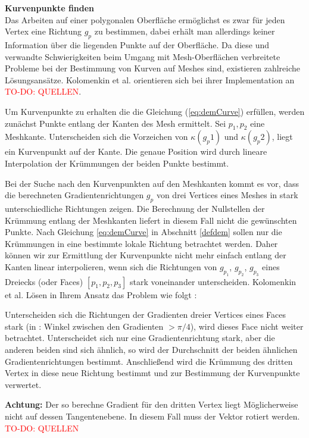 \documentclass{paperStyle}
\newcommand\todo[1]{\textcolor{red}{#1}}
\begin{document}
 \textbf{Kurvenpunkte finden}\\
 Das Arbeiten auf einer polygonalen Oberfläche ermöglichst es zwar für jeden Vertex eine Richtung $g_p$ zu bestimmen, dabei erhält man allerdings keiner Information über die liegenden Punkte auf der Oberfläche. Da diese und verwandte Schwierigkeiten beim Umgang mit Mesh-Oberflächen verbreitete Probleme bei der Bestimmung von Kurven auf Meshes sind, existieren zahlreiche Lösungsansätze. Kolomenkin et al. orientieren sich bei ihrer Implementation an \todo{TO-DO: QUELLEN}.
 
  Um Kurvenpunkte zu erhalten die die Gleichung (\ref{eq:demCurve}) erfüllen, werden zunächst Punkte entlang der Kanten des Mesh ermittelt. Sei $p_1,p_2$ eine Meshkante. Unterscheiden sich die Vorzeichen von $\kappa(g_p1)$ und $\kappa(g_p2)$, liegt ein Kurvenpunkt auf der Kante. Die genaue Position wird durch lineare Interpolation der Krümmungen der beiden Punkte bestimmt.
 
 Bei der Suche nach den Kurvenpunkten auf den Meshkanten kommt es vor, dass die berechneten Gradientenrichtungen $g_p$ von drei Vertices eines Meshes in stark unterschiedliche Richtungen zeigen. Die Berechnung der Nullstellen der Krümmung entlang der Meshkanten liefert in diesem Fall nicht die gewünschten Punkte. Nach Gleichung \ref{eq:demCurve} in Abschnitt \ref{defdem} sollen nur die Krümmungen in eine bestimmte lokale Richtung betrachtet werden. Daher können wir zur Ermittlung der Kurvenpunkte nicht mehr einfach entlang der Kanten linear interpolieren, wenn sich die Richtungen von $g_{p_1}$, $g_{p_2}$, $g_{p_3}$ eines Dreiecks (oder Faces) $[p_1, p_2, p_3]$ stark voneinander unterscheiden. Kolomenkin et al. Lösen in Ihrem Ansatz das Problem wie folgt \cite{Demarcating}: 
 
 Unterscheiden sich die Richtungen der Gradienten dreier Vertices eines Faces stark (in \cite{Demarcating}: Winkel zwischen den Gradienten $> \pi/4$), wird dieses Face nicht weiter betrachtet. Unterscheidet sich nur eine Gradientenrichtung stark, aber die anderen beiden sind sich ähnlich, so wird der Durchschnitt der beiden ähnlichen Gradientenrichtungen bestimmt. Anschließend wird die Krümmung des dritten Vertex in diese neue Richtung bestimmt und zur Bestimmung der Kurvenpunkte verwertet. 
 
 \textbf{Achtung:} Der so berechne Gradient für den dritten Vertex liegt Möglicherweise nicht auf dessen Tangentenebene. In diesem Fall muss der Vektor rotiert werden. \todo{TO-DO: QUELLEN} 
 
\end{document}
